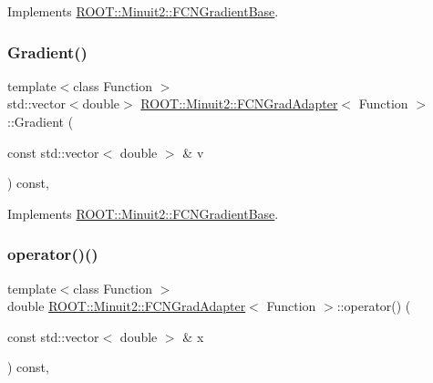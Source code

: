 Implements \mbox{\hyperlink{classROOT_1_1Minuit2_1_1FCNGradientBase_a004740e7e25a1358aafde6694196ef88}{R\+O\+O\+T\+::\+Minuit2\+::\+F\+C\+N\+Gradient\+Base}}.

\mbox{\label{classROOT_1_1Minuit2_1_1FCNGradAdapter_ae91d0453fd5e953f75551576659d6c7b}} 
\subsubsection{\texorpdfstring{Gradient()}{Gradient()}\hspace{0.1cm}{\footnotesize\ttfamily [2/2]}}
{\footnotesize\ttfamily template$<$class Function $>$ \\
std\+::vector$<$double$>$ \mbox{\hyperlink{classROOT_1_1Minuit2_1_1FCNGradAdapter}{R\+O\+O\+T\+::\+Minuit2\+::\+F\+C\+N\+Grad\+Adapter}}$<$ Function $>$\+::Gradient (\begin{DoxyParamCaption}\item[{const std\+::vector$<$ double $>$ \&}]{v }\end{DoxyParamCaption}) const\hspace{0.3cm}{\ttfamily [inline]}, {\ttfamily [virtual]}}



Implements \mbox{\hyperlink{classROOT_1_1Minuit2_1_1FCNGradientBase_a004740e7e25a1358aafde6694196ef88}{R\+O\+O\+T\+::\+Minuit2\+::\+F\+C\+N\+Gradient\+Base}}.

\mbox{\label{classROOT_1_1Minuit2_1_1FCNGradAdapter_a101e87d4c03ae367b24227b41bb258c4}} 
\subsubsection{\texorpdfstring{operator()()}{operator()()}\hspace{0.1cm}{\footnotesize\ttfamily [1/4]}}
{\footnotesize\ttfamily template$<$class Function $>$ \\
double \mbox{\hyperlink{classROOT_1_1Minuit2_1_1FCNGradAdapter}{R\+O\+O\+T\+::\+Minuit2\+::\+F\+C\+N\+Grad\+Adapter}}$<$ Function $>$\+::operator() (\begin{DoxyParamCaption}\item[{const std\+::vector$<$ double $>$ \&}]{x }\end{DoxyParamCaption}) const\hspace{0.3cm}{\ttfamily [inline]}, {\ttfamily [virtual]}}

